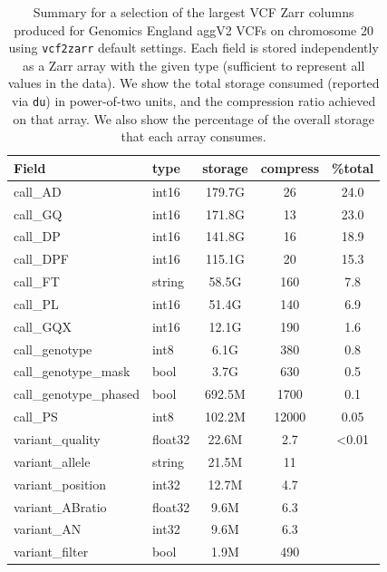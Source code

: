 \documentclass[a4paper,num-refs]{oup-contemporary}
\begin{document}
\begin{table}
\caption{Summary for a selection of the largest VCF Zarr columns produced for 
Genomics England aggV2 VCFs on chromosome 20 using \texttt{vcf2zarr}
default settings. Each field is stored independently 
as a Zarr array with the given type (sufficient to represent all values in the
data). We show the total storage consumed (reported via \texttt{du}) in 
power-of-two units, and the compression ratio achieved on that array.
We also show the percentage of the overall storage that each array consumes.
\label{tab-genomics-england-data}}
\begin{tabular}{llS[table-format=3.1]S[table-format=3.2]S[table-format=3.2]}
\toprule
{Field} & {type} & {storage} & {compress} & {\%total} \\
\midrule
call\_AD &  int16 & 179.7G & 26 & 24.0\\
call\_GQ &  int16 & 171.8G & 13 & 23.0 \\
call\_DP &  int16 & 141.8G & 16 & 18.9 \\
call\_DPF& int16  & 115.1G & 20 & 15.3\\
call\_FT &  string & 58.5G & 160 & 7.8 \\
call\_PL &  int16 & 51.4G & 140 & 6.9 \\
call\_GQX &  int16 & 12.1G & 190 & 1.6 \\
call\_genotype & int8 & 6.1G & 380 & 0.8 \\
call\_genotype\_mask & bool & 3.7G  & 630 & 0.5\\
call\_genotype\_phased & bool & 692.5M  & 1700 & 0.1 \\
call\_PS  & int8  & 102.2M & 12000 & 0.05 \\
variant\_quality & float32 & 22.6M & 2.7 & <0.01 \\
variant\_allele & string & 21.5M & 11 \\
variant\_position & int32 & 12.7M & 4.7 \\
variant\_ABratio & float32 & 9.6M & 6.3 \\
variant\_AN & int32 & 9.6M & 6.3 \\
variant\_filter & bool & 1.9M & 490 \\
\bottomrule
\end{tabular}
\end{table}

\end{document}
